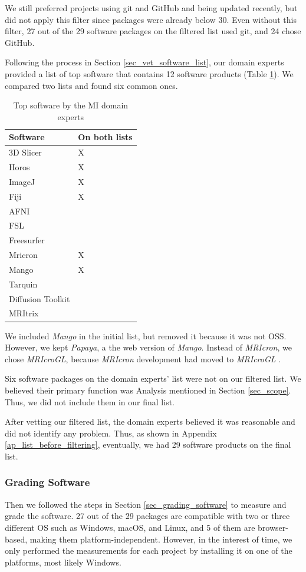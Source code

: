 \documentclass[preprint,12pt,authoryear]{elsarticle}
\begin{document}
We still preferred projects using git and GitHub and being updated recently, but
did not apply this filter since packages were already below 30. Even without
this filter, 27 out of the 29 software packages on the filtered list used git,
and 24 chose GitHub.

Following the process in Section \ref{sec_vet_software_list}, our domain experts
provided a list of top software that contains 12 software products (Table
\ref{tab_top_software_experts}). We compared two lists and found six common
ones.

\begin{table}[ht]
\centering
\begin{tabular}{ll}
\hline
Software & On both lists \\ \hline
3D Slicer & X \\
Horos & X \\
ImageJ & X \\
Fiji & X \\
AFNI &  \\
FSL &  \\
Freesurfer &  \\
Mricron & X \\
Mango & X \\
Tarquin &  \\
Diffusion Toolkit &  \\
MRItrix &  \\ \hline
\end{tabular}
\caption{\label{tab_top_software_experts}Top software by the MI domain experts}
\end{table}

We included \textit{Mango} in the initial list, but removed it because it was
not OSS. However, we kept \textit{Papaya}, a the web version of \textit{Mango}.
Instead of \textit{MRIcron}, we chose \textit{MRIcroGL}, because
\textit{MRIcron} development had moved to \textit{MRIcroGL} \citep{Rorden2021b}.

Six software packages on the domain experts' list were not on our filtered list.
We believed their primary function was Analysis mentioned in Section
\ref{sec_scope}. Thus, we did not include them in our final list.

After vetting our filtered list, the domain experts believed it was reasonable
and did not identify any problem. Thus, as shown in Appendix
\ref{ap_list_before_filtering}, eventually, we had 29 software products on the
final list. 

\subsubsection{Grading Software}
\label{sec_applying_method_grading}
Then we followed the steps in Section \ref{sec_grading_software} to measure and grade the software. 27 out of the 29 packages are compatible with two or three different OS such as Windows, macOS, and Linux, and 5 of them are browser-based, making them platform-independent. However, in the interest of time, we only performed the measurements for each project by installing it on one of the platforms, most likely Windows.
\end{document}
